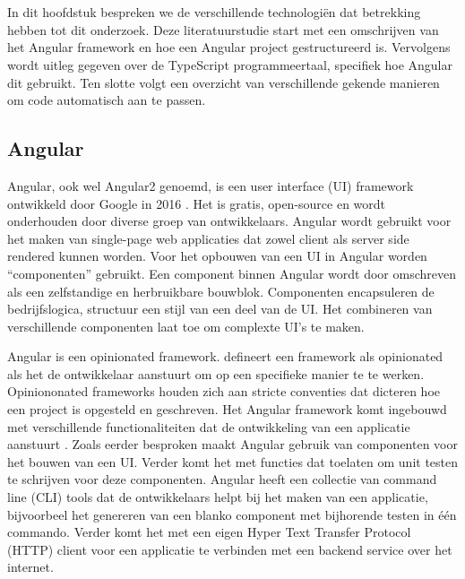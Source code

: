 \chapter{}%
\label{ch:stand-van-zaken}

In dit hoofdstuk bespreken we de verschillende technologiën dat betrekking hebben tot dit onderzoek.
Deze literatuurstudie start met een omschrijven van het Angular framework en hoe een Angular project gestructureerd is.
Vervolgens wordt uitleg gegeven over de TypeScript programmeertaal, specifiek hoe Angular dit gebruikt.
Ten slotte volgt een overzicht van verschillende gekende manieren om code automatisch aan te passen.

\section{Angular}
\label{ch:stand-van-zaken:angular}

Angular, ook wel Angular2 genoemd, is een user interface (UI) framework ontwikkeld door Google in 2016 \autocite{Cincovic2019}.
Het is gratis, open-source en wordt onderhouden door diverse groep van ontwikkelaars.
Angular wordt gebruikt voor het maken van single-page web applicaties dat zowel client als server side rendered kunnen worden.
Voor het opbouwen van een UI in Angular worden ``componenten'' gebruikt.
Een component binnen Angular wordt door \textcite{Kaufman2016} omschreven als een zelfstandige en herbruikbare bouwblok.
Componenten encapsuleren de bedrijfslogica, structuur een stijl van een deel van de UI.
Het combineren van verschillende componenten laat toe om complexte UI's te maken.

Angular is een opinionated framework.
\textcite{Parker2017} defineert een framework als opinionated als het de ontwikkelaar aanstuurt om op een specifieke manier te te werken.
Opiniononated frameworks houden zich aan stricte conventies dat dicteren hoe een project is opgesteld en geschreven.
Het Angular framework komt ingebouwd met verschillende functionaliteiten dat de ontwikkeling van een applicatie aanstuurt \autocite{Wilken2018}.
Zoals eerder besproken maakt Angular gebruik van componenten voor het bouwen van een UI.
Verder komt het met functies dat toelaten om unit testen te schrijven voor deze componenten.
Angular heeft een collectie van command line (CLI) tools dat de ontwikkelaars helpt bij het maken van een applicatie, bijvoorbeel het genereren van een blanko component met bijhorende testen in één commando.
Verder komt het met een eigen Hyper Text Transfer Protocol (HTTP) client voor een applicatie te verbinden met een backend service over het internet.

